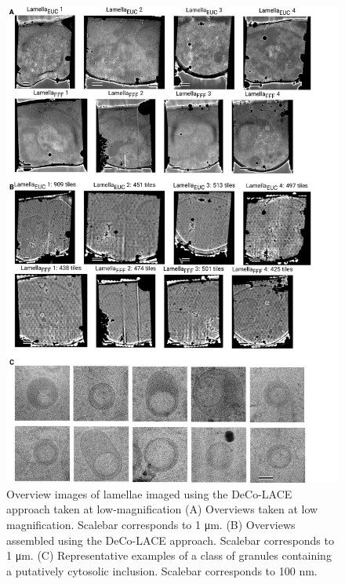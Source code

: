 \documentclass[
]{article}
\newenvironment{fignos:tagged-figure}[1][]{
    \let\oldthefigure\thefigure
    \let\oldtheHfigure\theHfigure
    \renewcommand{\thefigure}{#1}
    \renewcommand{\theHfigure}{#1}
  }{
    \let\thefigure\oldthefigure
    \let\theHfigure\oldtheHfigure
    \addtocounter{figure}{-1}
  }
\begin{document}
\begin{fignos:tagged-figure}

\begin{figure}
\hypertarget{fig:lamella_images}{%
\centering
\includegraphics{figures/lamella_images.png}
\caption{Overview images of lamellae imaged using the DeCo-LACE approach taken at low-magnification (A) Overviews taken at low magnification. Scalebar corresponds to 1 μm. (B) Overviews assembled using the DeCo-LACE approach. Scalebar corresponds to 1 μm. (C) Representative examples of a class of granules containing a putatively cytosolic inclusion. Scalebar corresponds to 100 nm.}\label{fig:lamella_images}
}
\end{figure}

\end{fignos:tagged-figure}
\end{document}

